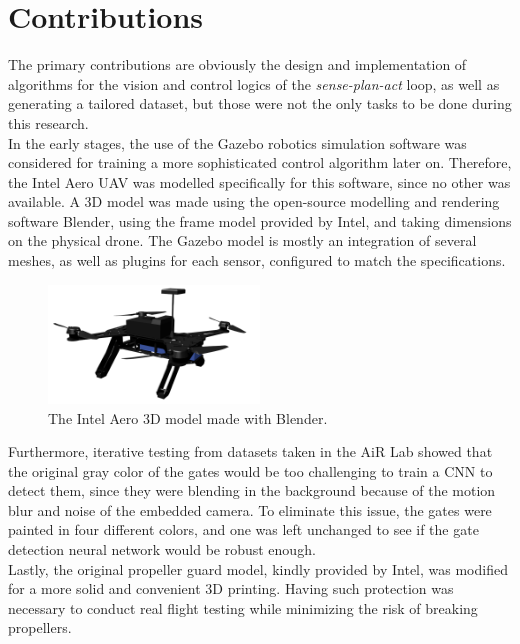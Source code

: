 \section{Contributions}

The primary contributions are obviously the design and implementation of
algorithms for the vision and control logics of the \emph{sense-plan-act} loop,
as well as generating a tailored dataset, but those were not the only tasks to
be done during this research.\\

In the early stages, the use of the Gazebo robotics simulation software was
considered for training a more sophisticated control algorithm later on.
Therefore, the Intel Aero UAV was modelled specifically for this software,
since no other was available. A 3D model was made using the open-source
modelling and rendering software Blender, using the frame model provided by
Intel, and taking dimensions on the physical drone. The Gazebo model is mostly
an integration of several meshes, as well as plugins for each sensor, configured
to match the specifications.

\begin{figure}[h]
	\centering
	\includegraphics[width=0.5\textwidth]{figure/aero.png}
	\caption{The Intel Aero 3D model made with Blender.}
	\label{fig:aero}
\end{figure}

Furthermore, iterative testing from datasets taken in the AiR Lab showed that
the original gray color of the gates would be too challenging to train a CNN to
detect them, since they were blending in the background because of the motion
blur and noise of the embedded camera. To eliminate this issue, the gates were
painted in four different colors, and one was left unchanged to see if the gate
detection neural network would be robust enough.\\

Lastly, the original propeller guard model, kindly provided by Intel, was
modified for a more solid and convenient 3D printing. Having such protection was
necessary to conduct real flight testing while minimizing the risk of breaking
propellers.

